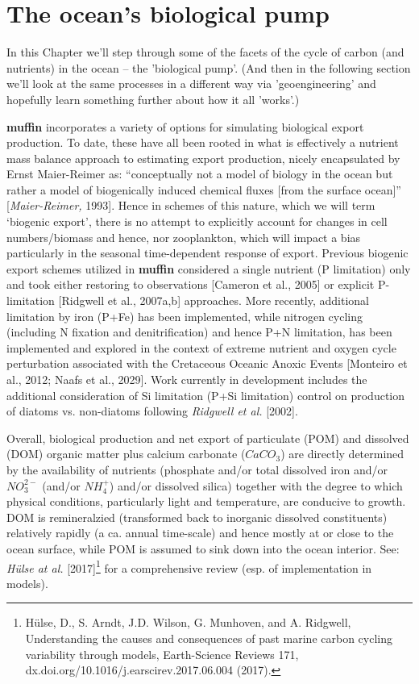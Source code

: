 \documentclass[11pt,fleqn]{book} %
\begin{document}
\newpage


\section{The ocean's biological pump}

In this Chapter we'll step through some of the facets of the cycle of carbon (and nutrients) in the ocean -- the 'biological pump'. (And then in the following section we'll look at the same processes in a different way via 'geoengineering' and hopefully learn something further about how it all  'works'.)

\textbf{muffin} incorporates a variety of options for simulating biological export production. To date, these have all been rooted in what is effectively a nutrient mass balance approach to estimating export production, nicely encapsulated by Ernst Maier-Reimer as: “conceptually not a model of biology in the ocean but rather a model of biogenically induced chemical fluxes [from the surface ocean]” [\textit{Maier-Reimer,} 1993]. Hence in schemes of this nature, which we will term ‘biogenic export’, there is no attempt to explicitly account for changes in cell numbers/biomass and hence, nor zooplankton, which will impact a bias particularly in the seasonal time-dependent response of export. Previous biogenic export schemes utilized in  \textbf{muffin}  considered a single nutrient (P limitation) only and took either restoring to observations [Cameron et al., 2005] or explicit P-limitation [Ridgwell et al., 2007a,b] approaches. More recently, additional limitation by iron (P+Fe) has been implemented, while nitrogen cycling (including N fixation and denitrification) and hence P+N limitation, has been implemented and explored in the context of extreme nutrient and oxygen cycle perturbation associated with the Cretaceous Oceanic Anoxic Events [Monteiro et al., 2012; Naafs et al., 2029]. Work currently in development includes the additional consideration of Si limitation (P+Si limitation) control on production of diatoms vs. non-diatoms following \textit{Ridgwell et al.} [2002].

Overall, biological production and net export of particulate (POM) and dissolved (DOM) organic matter plus calcium carbonate (\(CaCO_{3}\)) are directly determined by the availability of nutrients (phosphate and/or total dissolved iron and/or \(NO^{2-}_{3}\) (and/or \(NH^{+}_{4}\)) and/or dissolved silica) together with the degree to which physical conditions, particularly light and temperature, are conducive to growth. DOM is remineralzied (transformed back to inorganic dissolved constituents) relatively rapidly (a ca. annual time-scale) and hence mostly at or close to the ocean surface, while POM is assumed to sink down into the ocean interior. See: \textit{Hülse at al.} [2017]\footnote{Hülse, D., S. Arndt, J.D. Wilson, G. Munhoven, and A. Ridgwell, Understanding the causes and consequences of past marine carbon cycling variability through models, Earth-Science Reviews 171, dx.doi.org/10.1016/j.earscirev.2017.06.004 (2017).} for a comprehensive review (esp. of implementation in models).
\end{document}
